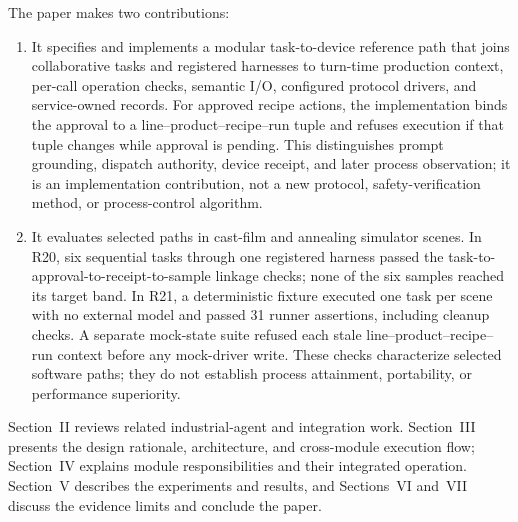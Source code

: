 The paper makes two contributions:
\begin{enumerate}
\item It specifies and implements a modular task-to-device reference path that
  joins collaborative tasks and registered harnesses to turn-time production
  context, per-call operation checks, semantic I/O, configured protocol
  drivers, and service-owned records. For approved recipe actions, the
  implementation binds the approval to a line--product--recipe--run tuple and
  refuses execution if that tuple changes while approval is pending. This
  distinguishes prompt grounding, dispatch authority, device receipt, and
  later process observation; it is an implementation contribution, not a new
  protocol, safety-verification method, or process-control algorithm.
\item It evaluates selected paths in cast-film and annealing simulator scenes.
  In R20, six sequential tasks through one registered harness passed the
  task-to-approval-to-receipt-to-sample linkage checks; none of the six samples
  reached its target band. In R21, a deterministic fixture executed one task
  per scene with no external model and passed 31 runner assertions, including
  cleanup checks. A separate mock-state suite refused each stale
  line--product--recipe--run context before any mock-driver write. These
  checks characterize selected
  software paths; they do not establish process attainment, portability, or
  performance superiority.
\end{enumerate}

Section~II reviews related industrial-agent and integration work.
Section~III presents the design rationale, architecture, and cross-module
execution flow; Section~IV explains module responsibilities and their
integrated operation. Section~V describes the experiments and results, and
Sections~VI and~VII discuss the evidence limits and conclude the paper.
